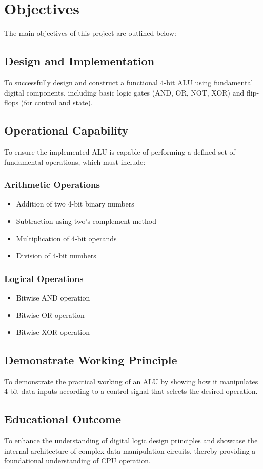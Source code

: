 \chapter{Objectives}

The main objectives of this project are outlined below:

\section{Design and Implementation}

To successfully design and construct a functional 4-bit ALU using fundamental digital components, including basic logic gates (AND, OR, NOT, XOR) and flip-flops (for control and state).

\section{Operational Capability}

To ensure the implemented ALU is capable of performing a defined set of fundamental operations, which must include:

\subsection{Arithmetic Operations}
\begin{itemize}
    \item Addition of two 4-bit binary numbers
    \item Subtraction using two's complement method
    \item Multiplication of 4-bit operands
    \item Division of 4-bit numbers
\end{itemize}

\subsection{Logical Operations}
\begin{itemize}
    \item Bitwise AND operation
    \item Bitwise OR operation
    \item Bitwise XOR operation
\end{itemize}

\section{Demonstrate Working Principle}

To demonstrate the practical working of an ALU by showing how it manipulates 4-bit data inputs according to a control signal that selects the desired operation.

\section{Educational Outcome}

To enhance the understanding of digital logic design principles and showcase the internal architecture of complex data manipulation circuits, thereby providing a foundational understanding of CPU operation.
